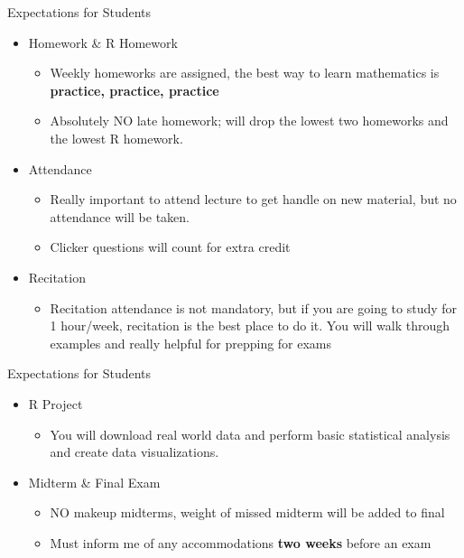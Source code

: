 \documentclass{beamer}
\begin{document}
\begin{frame}{Expectations for Students}
	
	\begin{itemize}
		\item Homework \& R Homework
            \begin{itemize}
		      	\item Weekly homeworks are assigned, the best way to learn mathematics is \textbf{practice, practice, practice}
		      	\item Absolutely NO late homework; will drop the lowest two homeworks and the lowest R homework.
            \end{itemize}

		\item Attendance
            \begin{itemize}
		      	\item Really important to attend lecture to get handle on new material, but no attendance will be taken.
		      	\item Clicker questions will count for extra credit
            \end{itemize}

        \item Recitation
            \begin{itemize}
                \item Recitation attendance is not mandatory, but if you are going to study for 1 hour/week, recitation is the best place to do it. You will walk through examples and really helpful for prepping for exams
            \end{itemize}
	\end{itemize}
	
\end{frame}

\begin{frame}{Expectations for Students}
	
	\begin{itemize}
        \item R Project
            \begin{itemize}
                \item You will download real world data and perform basic statistical analysis and create data visualizations.
            \end{itemize} 

		\item Midterm \& Final Exam
            \begin{itemize}
		      	\item NO makeup midterms, weight of missed midterm will be added to final
		      	\item Must inform me of any accommodations \textbf{two weeks} before an exam
            \end{itemize}
	\end{itemize}
	
\end{frame}
\end{document}
